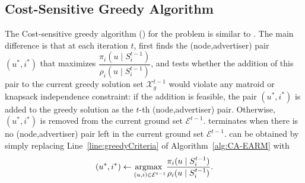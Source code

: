 \vspace{2mm} \subsection{Cost-Sensitive Greedy Algorithm}
The Cost-sensitive greedy algorithm (\CSRM) for the \RM problem is similar to \CARM. The main difference is that at each iteration $t$, \CSRM first finds the (node,advertiser) pair $(u^*,i^*)$ that maximizes $\dfrac{\pi_i(u \mid S^{t-1}_i)}{\rho_i(u \mid S^{t-1}_i)} $, and tests whether the addition of this pair to the current greedy solution set $\mathcal{X}_g^{t-1}$ would violate any matroid or knapsack independence constraint: if the addition is feasible, %
the pair $(u^*,i^*)$ is added to the greedy solution as the $t$-th (node,advertiser) pair. Otherwise, $(u^*,i^*)$ is removed from the current ground set %
$\mathcal{E}^{t-1}$.
\CSRM terminates when there is no (node,advertiser) pair left in the current ground set $\mathcal{E}^{t-1}$. \CSRM can be obtained by simply replacing Line~\ref{line:greedyCriteria} of Algorithm~\ref{alg:CA-EARM} with
$$ (u^*,i^*) \leftarrow \underset{(u,i) \in \mathcal{E}^{t-1}} {\operatorname*{\arg\!\max~}} \dfrac{\pi_i(u \mid S^{t-1}_i)}{\rho_i(u \mid S^{t-1}_i)}. $$


